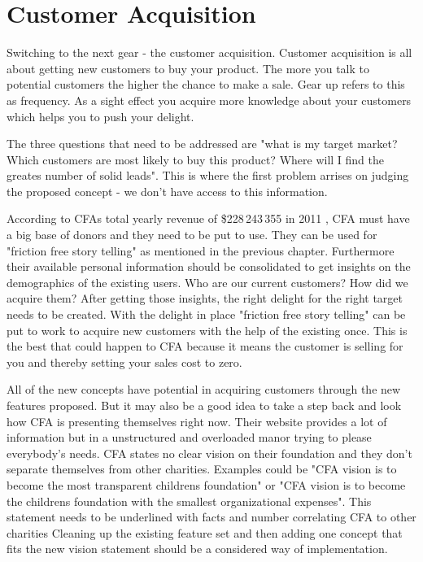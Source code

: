 \section{Customer Acquisition}

Switching to the next gear - the customer acquisition. Customer acquisition is all about getting new customers to buy your product. The more you talk to potential customers the higher the chance to make a sale. Gear up refers to this as frequency. As a sight effect you acquire more knowledge about your customers which helps you to push your delight.

The three questions that need to be addressed are "what is my target market? Which customers are most likely to buy this product? Where will I find the greates number of solid leads"\cite{Ramfelt}. This is where the first problem arrises on judging the proposed concept - we don't have access to this information. 

According to CFAs total yearly revenue of  \$228\,243\,355 in 2011 \cite{Charity}, CFA must have a big base of donors and they need to be put to use. They can be used for "friction free story telling" as mentioned in the previous chapter. Furthermore their available personal information should be consolidated to get insights on the demographics of the existing users. Who are our current customers? How did we acquire them? After getting those insights, the right delight for the right target needs to be created. With the delight in place "friction free story telling" can be put to work to acquire new customers with the help of the existing once. This is the best that could happen to CFA because it means the customer is selling for you and thereby setting your sales cost to zero.


All of the new concepts have potential in acquiring customers through the new features proposed. But it may also be a good idea to take a step back and look how CFA is presenting themselves right now. Their website provides a lot of information but in a unstructured and overloaded manor trying to please everybody's needs. CFA states no clear vision on their foundation and they don't separate themselves from other charities. Examples could be "CFA vision is to become the most transparent childrens foundation" or "CFA vision is to become the childrens foundation with the smallest organizational expenses". This statement needs to be underlined with facts and number correlating CFA to other charities Cleaning up the existing feature set and then adding one concept that fits the new vision statement should be a considered way of implementation.



